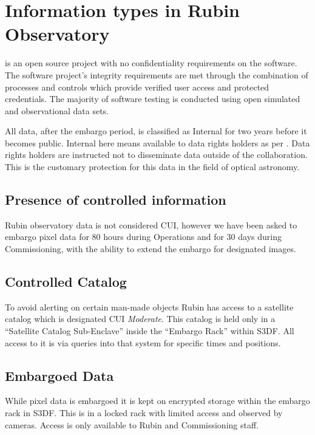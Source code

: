 \section{Information types in Rubin Observatory} \label{sec:infotypes}

\VRO is an open source project with no confidentiality requirements on the \gls{software}.
The \gls{software} project’s integrity requirements are met through the combination of
processes and controls which provide verified user access and protected credentials.
The majority of \gls{software} testing is conducted using open simulated and observational data sets.

All data, after the embargo period,  is classified as Internal for two years before it becomes public.
Internal here means available to data rights holders as per .
Data rights holders are instructed not to disseminate data outside of the collaboration.
This is the customary protection for this data in the field of optical astronomy.

\subsection{Presence of controlled information}\label{sec:cui}
Rubin observatory data is not considered \gls{CUI}, however we have been asked to embargo pixel data for 80 hours during \gls{Operations} and for 30 days during Commissioning, with the ability to extend the embargo for designated images.

\subsection{Controlled Catalog}\label{sec:controllescat}
To avoid alerting on certain man-made objects Rubin has access to a satellite catalog which is designated \gls{CUI}  \emph{Moderate}.
This catalog is held only in a ``Satellite Catalog Sub-Enclave'' inside the ``Embargo Rack'' within \gls{S3DF}.
All access to it is via queries into that system for specific times and positions.

\subsection{Embargoed Data} \label{sec:embargo}
While pixel data is embargoed it is kept on encrypted storage within the embargo rack in \gls{S3DF}.
This is in a locked rack with limited access and observed by cameras.
Access is only available to Rubin and \gls{Commissioning} staff.


